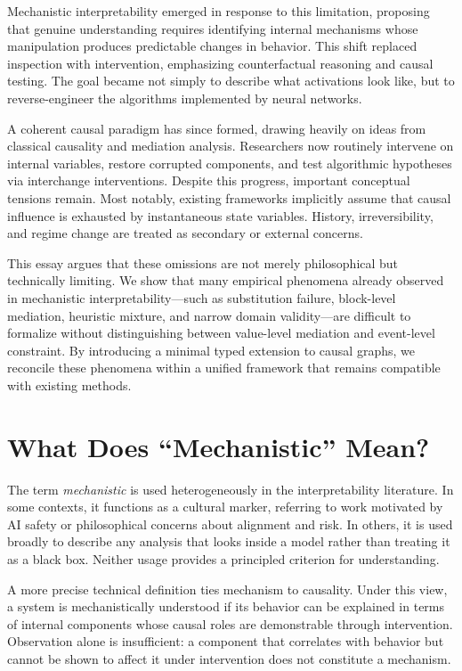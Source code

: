 \documentclass[11pt]{article}
\theoremstyle{remark}
\begin{document}
Mechanistic interpretability emerged in response to this limitation, proposing that genuine understanding requires identifying internal mechanisms whose manipulation produces predictable changes in behavior. This shift replaced inspection with intervention, emphasizing counterfactual reasoning and causal testing. The goal became not simply to describe what activations look like, but to reverse-engineer the algorithms implemented by neural networks.

A coherent causal paradigm has since formed, drawing heavily on ideas from classical causality and mediation analysis. Researchers now routinely intervene on internal variables, restore corrupted components, and test algorithmic hypotheses via interchange interventions. Despite this progress, important conceptual tensions remain. Most notably, existing frameworks implicitly assume that causal influence is exhausted by instantaneous state variables. History, irreversibility, and regime change are treated as secondary or external concerns.

This essay argues that these omissions are not merely philosophical but technically limiting. We show that many empirical phenomena already observed in mechanistic interpretability—such as substitution failure, block-level mediation, heuristic mixture, and narrow domain validity—are difficult to formalize without distinguishing between value-level mediation and event-level constraint. By introducing a minimal typed extension to causal graphs, we reconcile these phenomena within a unified framework that remains compatible with existing methods.

\section{What Does ``Mechanistic'' Mean?}

The term \emph{mechanistic} is used heterogeneously in the interpretability literature. In some contexts, it functions as a cultural marker, referring to work motivated by AI safety or philosophical concerns about alignment and risk. In others, it is used broadly to describe any analysis that looks inside a model rather than treating it as a black box. Neither usage provides a principled criterion for understanding.

A more precise technical definition ties mechanism to causality. Under this view, a system is mechanistically understood if its behavior can be explained in terms of internal components whose causal roles are demonstrable through intervention. Observation alone is insufficient: a component that correlates with behavior but cannot be shown to affect it under intervention does not constitute a mechanism.
\end{document}
